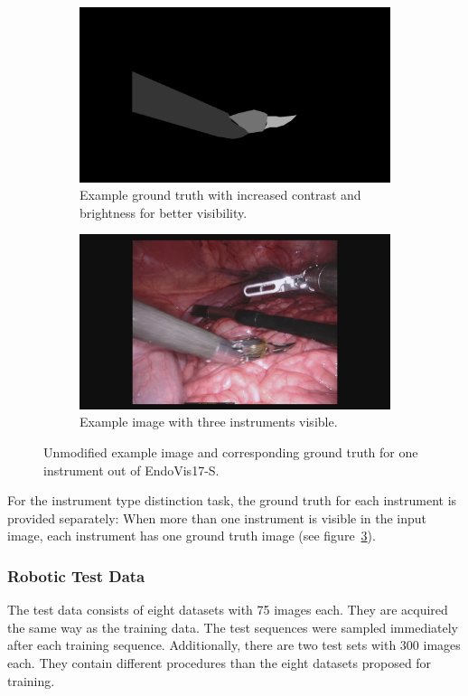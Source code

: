 \begin{figure}
\centering
\begin{subfigure}[t]{0.49\textwidth}
	\centering
	\includegraphics[width=.75\textwidth]{images/dataset/robotic17_segm/high_contrast_map_dataset1_maryland_frame009.png}
	\caption{Example ground truth with increased contrast and brightness for better visibility.}
	\label{img:mask_endovis17}
\end{subfigure}
\begin{subfigure}[t]{0.49\textwidth}
	\centering	
	\includegraphics[width=.75\textwidth]{images/dataset/robotic17_segm/dataset1_frame009_3instruments.png}
	\caption{Example image with three instruments visible.}
	\label{img:original_endovis17_image}
\end{subfigure}
\caption[Example data EndoVis17-S]{Unmodified example image and corresponding ground truth for one instrument out of EndoVis17-S.}
\label{img:endovis17_orig_gt_and_image}
\end{figure}

For the instrument type distinction task, the ground truth for each instrument is provided separately: When more than one instrument is visible in the input image, each instrument has one ground truth image (see figure~\ref{img:endovis17_orig_gt_and_image}).

\subsubsection{Robotic Test Data}
The test data consists of eight datasets with 75 images each. They are acquired the same way as the training data. The test sequences were sampled immediately after each training sequence.
Additionally, there are two test sets with 300 images each. They contain different procedures than the eight datasets proposed for training.

